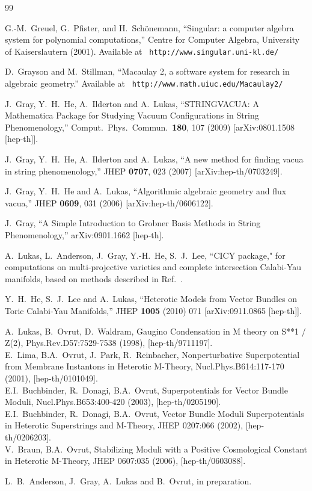 \documentclass[12pt]{article}
\numberwithin{equation}{section}
\begin{document}
\begin{thebibliography}{99}

  G.-M.~Greuel, G.~Pfister, and H.~Sch\"onemann,
  ``Singular: a computer algebra system for polynomial
    computations,'' Centre for Computer Algebra, University of
  Kaiserslautern (2001).  Available at {\tt
    http://www.singular.uni-kl.de/}

  D.~Grayson and M.~Stillman, ``Macaulay 2, a software system for
  research in algebraic geometry.''  Available at {\tt
    http://www.math.uiuc.edu/Macaulay2/}

  J.~Gray, Y.~H.~He, A.~Ilderton and A.~Lukas,
  ``STRINGVACUA: A Mathematica Package for Studying Vacuum Configurations in
  String Phenomenology,''
  Comput.\ Phys.\ Commun.\  {\bf 180}, 107 (2009)
  [arXiv:0801.1508 [hep-th]].

  J.~Gray, Y.~H.~He, A.~Ilderton and A.~Lukas,
  ``A new method for finding vacua in string phenomenology,''
  JHEP {\bf 0707}, 023 (2007)
  [arXiv:hep-th/0703249].

  J.~Gray, Y.~H.~He and A.~Lukas,
  ``Algorithmic algebraic geometry and flux vacua,''
  JHEP {\bf 0609}, 031 (2006)
  [arXiv:hep-th/0606122].
  
  J.~Gray,
  ``A Simple Introduction to Grobner Basis Methods in String Phenomenology,''
  arXiv:0901.1662 [hep-th].
  
   A.~Lukas, L.~Anderson, J.~Gray, Y.-H.~He, S.~J.~Lee, ``CICY package," for computations on multi-projective varieties and complete intersection Calabi-Yau manifolds, based on methods described in Ref.~\cite{Anderson:2009mh,Anderson:2007nc,Anderson:2008uw,He:2009wi}.
 
  Y.~H.~He, S.~J.~Lee and A.~Lukas,
  ``Heterotic Models from Vector Bundles on Toric Calabi-Yau Manifolds,''
  JHEP {\bf 1005} (2010) 071
  [arXiv:0911.0865 [hep-th]].

A.~Lukas, B.~Ovrut, D.~Waldram, 
Gaugino Condensation in M theory on S**1 / Z(2),
Phys.Rev.D57:7529-7538 (1998),  [hep-th/9711197].\\
E.~Lima, B.A.~Ovrut, J.~Park, R.~Reinbacher,
Nonperturbative Superpotential from Membrane Instantons in Heterotic M-Theory,
Nucl.Phys.B614:117-170 (2001), [hep-th/0101049].\\
E.I.~Buchbinder, R.~Donagi, B.A.~Ovrut, 
Superpotentials for Vector Bundle Moduli,
Nucl.Phys.B653:400-420 (2003), [hep-th/0205190].\\
E.I.~Buchbinder, R.~Donagi, B.A.~Ovrut, 
Vector Bundle Moduli Superpotentials in Heterotic Superstrings and M-Theory,
JHEP 0207:066 (2002), [hep-th/0206203].\\
V.~Braun, B.A.~Ovrut,
Stabilizing Moduli with a Positive Cosmological Constant in Heterotic M-Theory,
JHEP 0607:035 (2006), [hep-th/0603088].

L.~B.~Anderson, J.~Gray, A.~Lukas and B.~Ovrut, in preparation.
 
\end{thebibliography}






%
\end{document}
